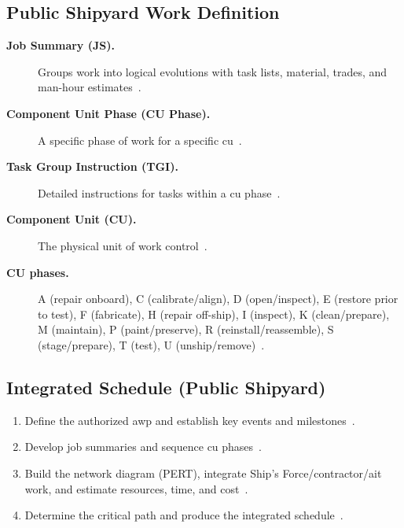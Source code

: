 \documentclass[../main.tex]{subfiles}
\begin{document}
\subsection{Public Shipyard Work Definition}
\begin{description}
  \item[\textbf{Job Summary (JS).}] Groups work into logical evolutions with task lists, material, trades, and man-hour estimates~\autocite{edo-4-2-1-cno-availability-planning-2025}.
  \item[\textbf{Component Unit Phase (CU Phase).}] A specific phase of work for a specific \ac{cu}~\autocite{edo-4-2-1-cno-availability-planning-2025}.
  \item[\textbf{Task Group Instruction (TGI).}] Detailed instructions for tasks within a \ac{cu} phase~\autocite{edo-4-2-1-cno-availability-planning-2025}.
  \item[\textbf{Component Unit (CU).}] The physical unit of work control~\autocite{edo-4-2-1-cno-availability-planning-2025}.
\end{description}
\begin{description}
  \item[\textbf{CU phases.}] A (repair onboard), C (calibrate/align), D (open/inspect), E (restore prior to test), F (fabricate), H (repair off-ship), I (inspect), K (clean/prepare), M (maintain), P (paint/preserve), R (reinstall/reassemble), S (stage/prepare), T (test), U (unship/remove)~\autocite{edo-4-2-1-cno-availability-planning-2025}.
\end{description}

\subsection{Integrated Schedule (Public Shipyard)}
\begin{enumerate}
  \item Define the authorized \ac{awp} and establish key events and milestones~\autocite{edo-4-2-1-cno-availability-planning-2025}.
  \item Develop job summaries and sequence \ac{cu} phases~\autocite{edo-4-2-1-cno-availability-planning-2025}.
  \item Build the network diagram (PERT), integrate Ship's Force/contractor/\ac{ait} work, and estimate resources, time, and cost~\autocite{edo-4-2-1-cno-availability-planning-2025}.
  \item Determine the critical path and produce the integrated schedule~\autocite{edo-4-2-1-cno-availability-planning-2025}.
\end{enumerate}
\end{document}
